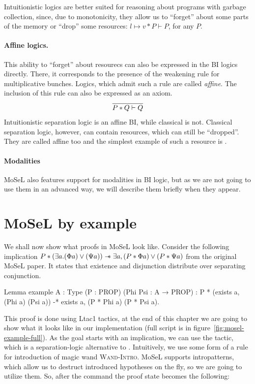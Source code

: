 Intuitionistic logics are better suited for reasoning about programs with garbage collection, since, due to monotonicity, they allow us to ``forget''  about some parts of the memory or ``drop'' some resources: \(l \mapsto v \ast P \vdash P\), for any \(P\).

\paragraph{Affine logics.}
This ability to ``forget'' about resourecs can also be expressed in the BI logics directly.
There, it corresponds to the presence of the weakening rule for multiplicative bunches.
Logics, which admit such a rule are called \emph{affine}.
The inclusion of this rule can also be expressed as an axiom.
\[\infer{P \ast Q\vdash Q}{}\]
Intuitionistic separation logic is an affine BI, while classical is not.
Classical separation logic, however, can contain resources, which can still be ``dropped''.
They are called affine too and the simplest example of such a resource is \emp.

\paragraph{Modalities}
MoSeL also features support for modalities in BI logic, but as we are not going to use them in an advanced way, we will describe them briefly when they appear.

\section{MoSeL by example}
\label{sec:mosel-example}

We shall now show what proofs in MoSeL look like.
Consider the following implication
\(P \ast (\exists a. (\Phi a) \vee (\Psi a)) \mathrel{-\mkern-6mu*} \exists a, (P \ast \Phi a) \vee (P \ast \Psi a)\) from the original MoSeL paper\cite{krebbersMoSeLGeneralExtensible2018}.
It states that existence and disjunction distribute over separating conjunction.

\begin{coq}
Lemma example {A : Type} (P : PROP) (Phi Psi : A → PROP) :
  P * (exists a, (Phi a) \/ (Psi a)) -* exists a, (P * Phi a) \/ (P * Psi a).
\end{coq}

This proof is done using Ltac1 tactics, at the end of this chapter we are going to show what it looks like in our implementation (full script is in figure~\ref{fig:mosel-example-full}).
As the goal starts with an implication, we can use the  tactic, which is a separation-logic alternative to .
Intuitively, we use some form of a rule for introduction of magic wand \textsc{Wand-Intro}.
MoSeL supports intropatterns, which allow us to destruct introduced hypotheses on the fly, so we are going to utilize them.
So, after the command  the proof state becomes the following:

